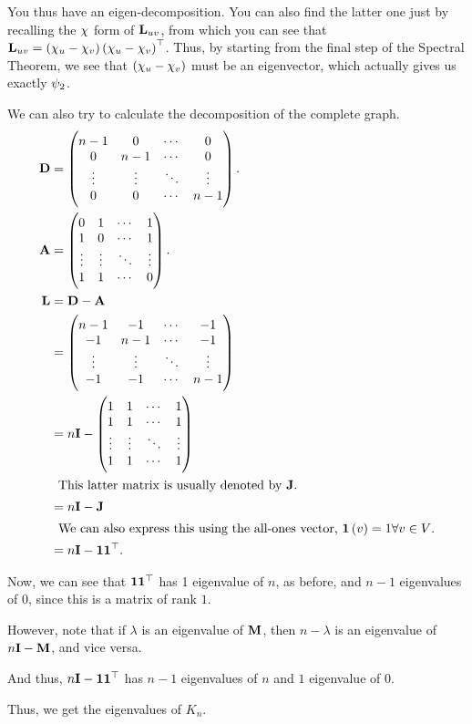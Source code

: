 \documentclass[11pt]{article}
\renewcommand\vec{\V}
\newcommand\itxt[1]{\intertext{\indent#1}}
\begin{document}
You thus have an eigen-decomposition.
You can also find the latter one
just by recalling the $\vec{\chi}$ form of $\V{L}_{uv}$,
from which you can see that
$\V{L}_{uv}=\paren{\vec{\chi}_u-\vec{\chi}_v}
\paren{\vec{\chi}_u-\vec{\chi}_v}^{\top}$.
Thus, by starting from the final step of the Spectral Theorem,
we see that $\paren{\vec{\chi}_u-\vec{\chi}_v}$ must be an eigenvector,
which actually gives us exactly $\vec{\psi}_2$.

We can also try to calculate the decomposition of the complete graph.
\begin{align*}
\V{D}&=\colvec{n-1&0&\cdots&0\\0&n-1&\cdots&0\\
\vdots&\vdots&\ddots&\vdots\\0&0&\cdots&n-1}.\\
\V{A}&=\colvec{0&1&\cdots&1\\1&0&\cdots&1\\
\vdots&\vdots&\ddots&\vdots\\1&1&\cdots&0}.\\
\V{L}&=\V{D}-\V{A}\\
&=\colvec{n-1&-1&\cdots&-1\\-1&n-1&\cdots&-1\\
\vdots&\vdots&\ddots&\vdots\\-1&-1&\cdots&n-1}\\
&=n\V{I}-\colvec{1&1&\cdots&1\\1&1&\cdots&1\\
\vdots&\vdots&\ddots&\vdots\\1&1&\cdots&1}\\
\itxt{This latter matrix is usually denoted by $\V{J}$.}
&=n\V{I}-\V{J}\\
\itxt{We can also express this using the all-ones vector,
$\vec{\V{1}}\paren{v}=1\forall v\in V$.}
&=n\V{I}-\vec{\V{1}}\vec{\V{1}}^{\top}.\\
\end{align*}

Now, we can see that $\vec{\V{1}}\vec{\V{1}}^{\top}$
has 1 eigenvalue of $n$, as before,
and $n-1$ eigenvalues of $0$, since this is a matrix of rank $1$.

However, note that if $\lambda$ is an eigenvalue of $\V{M}$,
then $n-\lambda$ is an eigenvalue of $n\V{I}-\V{M}$, and vice versa.

And thus, $n\V{I}-\vec{\V{1}}\vec{\V{1}}^{\top}$
has $n-1$ eigenvalues of $n$ and $1$ eigenvalue of $0$.

Thus, we get the eigenvalues of $K_n$.
\end{document}
